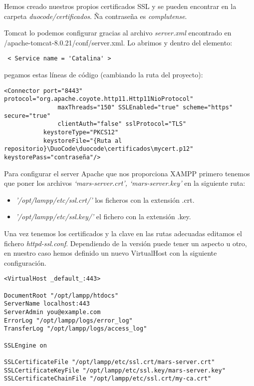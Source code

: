 \begin{itemize}
Hemos creado nuestros propios certificados SSL y se pueden encontrar en la carpeta \textit{duocode/certificados}. Ña contraseña es \textit{complutense}.

Tomcat lo podemos configurar gracias al archivo \textit{server.xml} encontrado en /apache-tomcat-8.0.21/conf/server.xml.
Lo abrimos y dentro del elemento:
{\codesize
\begin{verbatim}
 < Service name = 'Catalina' >  
\end{verbatim}
}
pegamos estas líneas de código (cambiando la ruta del proyecto):

{\codesize
\begin{verbatim}
<Connector port="8443" protocol="org.apache.coyote.http11.Http11NioProtocol"
               maxThreads="150" SSLEnabled="true" scheme="https" secure="true"
               clientAuth="false" sslProtocol="TLS"
           keystoreType="PKCS12"
           keystoreFile="{Ruta al repositorio}\DuoCode\duocode\certificados\mycert.p12" keystorePass="contraseña"/>
\end{verbatim}
}

Para configurar el server Apache que nos proporciona XAMPP primero tenemos que poner los archivos \textit{`mars-server.crt', `mars-server.key'} en la siguiente ruta:

\begin{itemize}


\item \textit{'/opt/lampp/etc/ssl.crt/'} los ficheros con la extensión .crt.

\item \textit{'/opt/lampp/etc/ssl.key/'} el fichero con la extensión .key.

\end{itemize}

Una vez tenemos los certificados y la clave en las rutas adecuadas editamos el fichero \textit{httpd-ssl.conf}. Dependiendo de la versión puede tener un aspecto u otro, en nuestro caso hemos definido un nuevo VirtualHost con la siguiente configuración.

{\codesize
\begin{verbatim}
<VirtualHost _default_:443>

DocumentRoot "/opt/lampp/htdocs"
ServerName localhost:443
ServerAdmin you@example.com
ErrorLog "/opt/lampp/logs/error_log"
TransferLog "/opt/lampp/logs/access_log"

SSLEngine on

SSLCertificateFile "/opt/lampp/etc/ssl.crt/mars-server.crt"
SSLCertificateKeyFile "/opt/lampp/etc/ssl.key/mars-server.key"
SSLCertificateChainFile "/opt/lampp/etc/ssl.crt/my-ca.crt"


\end{verbatim}}
\end{itemize}
